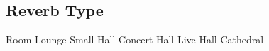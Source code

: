 \subsection{Reverb Type}









































Room
Lounge
Small Hall
Concert Hall
Live Hall
Cathedral
